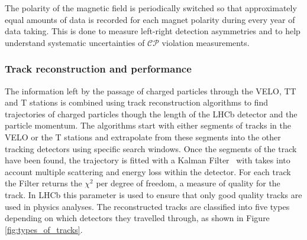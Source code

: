 

The polarity of the magnetic field is periodically switched so that approximately equal amounts of data is recorded for each magnet polarity during every year of data taking.
This is done to measure left-right detection asymmetries and to help understand systematic uncertainties of $\mathcal{CP}$ violation measurements. %


\subsubsection{Track reconstruction and performance}
\label{sec:Track_recon}


The information left by the passage of charged particles through the VELO, TT and T stations is combined using track reconstruction algorithms to find trajectories of charged particles though the length of the LHCb detector and the particle momentum.  
The algorithms start with either segments of tracks in the VELO or the T stations and extrapolate from these segments into the other tracking detectors using specific search windows. 
Once the segments of the track have been found, the trajectory is fitted with a Kalman Filter~\cite{Kalman,Fruhwirth:1987fm} with takes into account multiple scattering and energy loss within the detector. For each track the Filter returns the $\chi^{2}$ per degree of freedom, a measure of quality for the track. In LHCb this parameter is used to ensure that only good quality tracks are used in physics analyses. 
The reconstructed tracks are classified into five types depending on which detectors they travelled through, as shown in Figure \ref{fig:types_of_tracks}.



